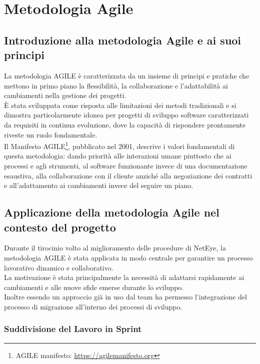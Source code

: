 \chapter{Metodologia Agile}
\label{cha:agile}

\section{Introduzione alla metodologia Agile e ai suoi principi}
\label{sec:introduzione_agile}

La metodologia AGILE è caratterizzata da un insieme di principi e pratiche che mettono
in primo piano la flessibilità, la collaborazione e l'adattabilità ai
cambiamenti nella gestione dei progetti.\\ È stata sviluppata come risposta alle
limitazioni dei metodi tradizionali e si dimostra particolarmente idonea per
progetti di sviluppo software caratterizzati da requisiti in continua evoluzione,
dove la capacità di rispondere prontamente riveste un ruolo fondamentale.\\ Il Manifesto
AGILE\footnote{AGILE manifesto: \url{https://agilemanifesto.org}}, pubblicato nel
2001, descrive i valori fondamentali di questa metodologia: dando priorità alle interazioni
umane piuttosto che ai processi e agli strumenti, al software funzionante invece
di una documentazione esaustiva, alla collaborazione con il cliente anziché alla
negoziazione dei contratti e all'adattamento ai cambiamenti invece del seguire un
piano.

\section{Applicazione della metodologia Agile nel contesto del progetto}
\label{sec:applicazione_agile}

Durante il tirocinio volto al miglioramento delle procedure di NetEye, la metodologia
AGILE è stata applicata in modo centrale per garantire un processo lavorativo dinamico
e collaborativo.\\ La motivazione è stata principalmente la necessità di adattarsi
rapidamente ai cambiamenti e alle nuove sfide emerse durante lo sviluppo.\\ Inoltre
essendo un approccio già in uso dal team ha permesso l'integrazione del processo
di migrazione all'interno dei processi di sviluppo.

\subsection{Suddivisione del Lavoro in Sprint}
\label{sub:sprint}

